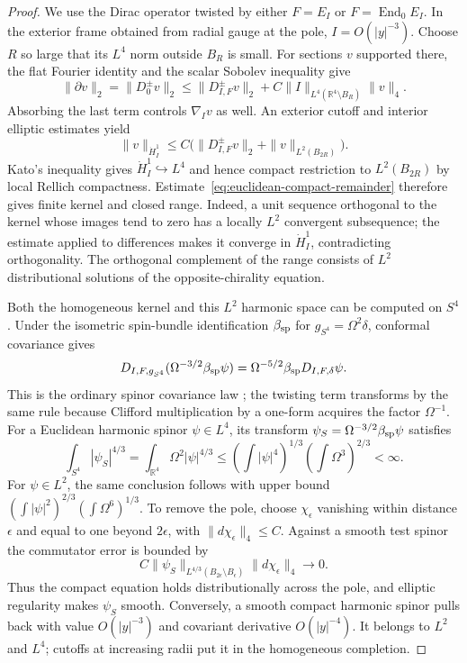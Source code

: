 \documentclass[11pt]{amsart}
\theoremstyle{definition}
\theoremstyle{remark}
\theoremstyle{plain}
\newcommand{\RR}{\mathbb{R}}
\begin{document}
\begin{proof}
We use the Dirac operator twisted by either $F=E_I$ or
$F=\operatorname{End}_0E_I$.  In the exterior frame obtained from radial
gauge at the pole, $I=O(|y|^{-3})$.  Choose $R$ so large that its
$L^4$ norm outside $B_R$ is small.  For sections $v$ supported there,
the flat Fourier identity and the scalar Sobolev inequality give
\[
 \|\partial v\|_2=\|D_0^\pm v\|_2
 \leq\|D_{I,F}^\pm v\|_2+
 C\|I\|_{L^4(\RR^4\setminus B_R)}\|v\|_4.
\]
Absorbing the last term controls $\nabla_Iv$ as well.  An exterior
cutoff and interior elliptic estimates yield
\begin{equation}\label{eq:euclidean-compact-remainder}
 \|v\|_{\dot H_I^1}
 \leq C\bigl(\|D_{I,F}^\pm v\|_2+\|v\|_{L^2(B_{2R})}\bigr).
\end{equation}
Kato's inequality gives $\dot H_I^1\hookrightarrow L^4$ and hence
compact restriction to $L^2(B_{2R})$ by local Rellich compactness.
Estimate~\eqref{eq:euclidean-compact-remainder} therefore gives finite
kernel and closed range.  Indeed, a unit sequence orthogonal to the
kernel whose images tend to zero has a locally $L^2$ convergent
subsequence; the estimate applied to differences makes it converge in
$\dot H_I^1$, contradicting orthogonality.  The orthogonal complement
of the range consists of $L^2$ distributional solutions of the
opposite-chirality equation.

Both the homogeneous kernel and this $L^2$ harmonic space can be
computed on $S^4$.  Under the isometric spin-bundle identification
$\beta_{\rm sp}$ for $g_{S^4}=\Omega^2\delta$, conformal covariance gives
\begin{equation}\label{eq:harmonic-conformal-covariance}
 D_{I,F,g_{S^4}}(\Omega^{-3/2}\beta_{\rm sp}\psi)
 =\Omega^{-5/2}\beta_{\rm sp}D_{I,F,\delta}\psi.
\end{equation}
This is the ordinary spinor covariance law
\cite[Section~3, after Proposition~3.3]{Fischmann13}; the twisting
term transforms by the same rule because Clifford multiplication
by a one-form acquires the factor $\Omega^{-1}$.
For a Euclidean harmonic spinor $\psi\in L^4$, its transform
$\psi_S=\Omega^{-3/2}\beta_{\rm sp}\psi$ satisfies
\[
 \int_{S^4}|\psi_S|^{4/3}
 =\int_{\RR^4}\Omega^2|\psi|^{4/3}
 \leq\left(\int|\psi|^4\right)^{1/3}
       \left(\int\Omega^3\right)^{2/3}<\infty.
\]
For $\psi\in L^2$, the same conclusion follows with upper bound
$(\int|\psi|^2)^{2/3}(\int\Omega^6)^{1/3}$.
To remove the pole, choose $\chi_\epsilon$ vanishing within distance
$\epsilon$ and equal to one beyond $2\epsilon$, with
$\|d\chi_\epsilon\|_4\leq C$.  Against a smooth test spinor the
commutator error is bounded by
\[
 C\|\psi_S\|_{L^{4/3}(B_{2\epsilon}\setminus B_\epsilon)}
 \|d\chi_\epsilon\|_4\longrightarrow0.
\]
Thus the compact equation holds distributionally across the pole,
and elliptic regularity makes $\psi_S$ smooth.  Conversely, a smooth
compact harmonic spinor pulls back with value $O(|y|^{-3})$ and
covariant derivative $O(|y|^{-4})$.  It belongs to $L^2$ and $L^4$;
cutoffs at increasing radii put it in the homogeneous completion.


\end{proof}
\end{document}
